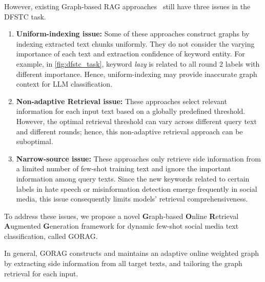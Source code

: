 	
	 However, existing Graph-based RAG approaches~\cite{edge2024local,guo2024lightrag,gutierrez2024hipporag} still have three issues in the DFSTC task.
 

 

\begin{enumerate}[leftmargin=10pt]
	
	\item 
	\textbf{Uniform-indexing
		issue:}
	Some of these approaches construct graphs by indexing extracted text chunks uniformly.
	They do not consider the varying importance of each text and extraction confidence of keyword entity.
		For example, in \autoref{fig:dfstc_task}, keyword \textit{lazy} is related to all round 2 labels with different importance. Hence, 
	uniform-indexing may provide inaccurate graph context for LLM classification.
	

	\item \textbf{Non-adaptive Retrieval issue:} These approaches select relevant information for each input text based on a globally predefined threshold. 
	However, the optimal retrieval threshold can vary across different query text and different rounds; hence, this non-adaptive retrieval approach can be suboptimal.
	
 
	\item	\textbf{Narrow-source issue:} These approaches only retrieve side information from a limited number of few-shot training text and ignore the important information among query texts. 
	Since the new keywords related to certain labels in hate speech or misinformation detection emerge frequently in social media, this issue consequently limits models' retrieval comprehensiveness. 
	
 

	
\end{enumerate}

	

To address these issues, we propose a novel 
\textbf{G}raph-based \textbf{O}nline \textbf{R}etrieval \textbf{A}ugmented \textbf{G}eneration framework for dynamic few-shot social media text classification, called GORAG.

In general, GORAG constructs and maintains an adaptive online weighted graph by extracting side information from all target texts, and tailoring the graph retrieval for each input.


